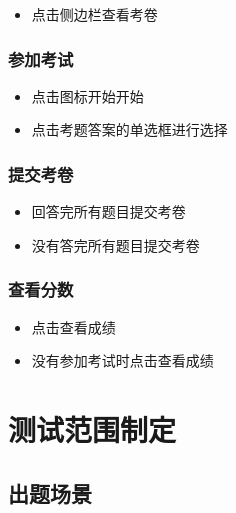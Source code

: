 \documentclass[hyperref, a4paper]{ctexart}
\providecommand{\tightlist}{%
  \setlength{\itemsep}{0pt}\setlength{\parskip}{0pt}}
\begin{document}
\begin{itemize}
\tightlist
\item
  点击侧边栏查看考卷
\end{itemize}

\hypertarget{ux53c2ux52a0ux8003ux8bd5}{%
\subsubsection{参加考试}\label{ux53c2ux52a0ux8003ux8bd5}}

\begin{itemize}
\tightlist
\item
  点击图标开始开始
\item
  点击考题答案的单选框进行选择
\end{itemize}

\hypertarget{ux63d0ux4ea4ux8003ux5377}{%
\subsubsection{提交考卷}\label{ux63d0ux4ea4ux8003ux5377}}

\begin{itemize}
\tightlist
\item
  回答完所有题目提交考卷
\item
  没有答完所有题目提交考卷
\end{itemize}

\hypertarget{ux67e5ux770bux5206ux6570}{%
\subsubsection{查看分数}\label{ux67e5ux770bux5206ux6570}}

\begin{itemize}
\tightlist
\item
  点击查看成绩
\item
  没有参加考试时点击查看成绩
\end{itemize}

\hypertarget{ux6d4bux8bd5ux8303ux56f4ux5236ux5b9a}{%
\section{测试范围制定}\label{ux6d4bux8bd5ux8303ux56f4ux5236ux5b9a}}

\hypertarget{ux51faux9898ux573aux666f}{%
\subsection{出题场景}\label{ux51faux9898ux573aux666f}}
\end{document}
